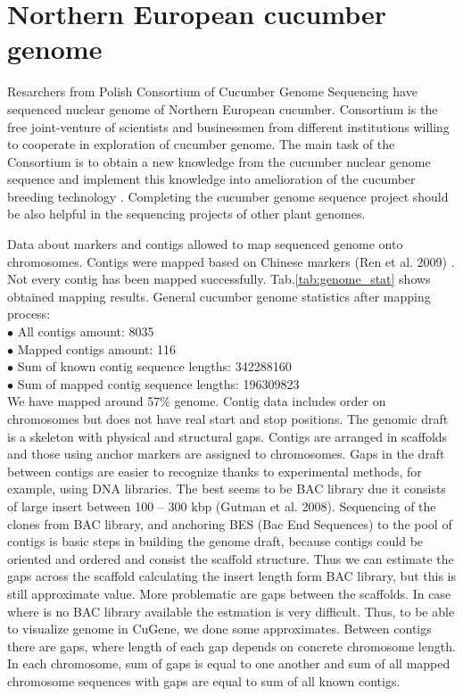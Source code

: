 \documentclass[a4paper]{spie}
\newcommand{\appName}{CuGene}
\begin{document}
\section{Northern European cucumber genome}
Resarchers from Polish Consortium of Cucumber Genome Sequencing have sequenced nuclear genome of Northern European cucumber.
Consortium is the free joint-venture of scientists and businessmen from different institutions willing to cooperate in exploration of cucumber genome. The main task of the Consortium is to obtain a new knowledge from the cucumber nuclear genome sequence and implement this knowledge into amelioration of the cucumber breeding technology \cite{pawelkowicz2016next, przybecki2003isolation, przybecki2004polymorphom}. Completing the cucumber genome sequence project should be also helpful in the sequencing projects of other plant genomes.

Data about markers and contigs allowed to map sequenced genome onto chromosomes. Contigs were mapped based on Chinese markers (Ren et al. 2009) . Not every contig has been mapped successfully. Tab.\ref{tab:genome_stat} shows obtained mapping results.
General cucumber genome statistics after mapping process:\\
$\bullet$ All contigs amount: 8035 \\
$\bullet$ Mapped contigs amount: 116 \\
$\bullet$ Sum of known contig sequence lengths: 342288160 \\
$\bullet$ Sum of mapped contig sequence lengths: 196309823 \\
We have mapped around 57\% genome. Contig data includes order on chromosomes but does not have real start and stop positions. The genomic draft is a skeleton with physical and structural gaps. Contigs  are arranged in scaffolds and those using anchor markers are assigned to chromosomes. Gaps in the draft between contigs are easier to recognize thanks to experimental methods, for example, using DNA libraries. The best seems to be BAC library due it consists of large insert  between 100 – 300 kbp (Gutman et al. 2008). Sequencing of the clones from BAC library, and anchoring BES (Bac End Sequences) to the pool of contigs is basic steps in building the genome draft, because contigs could be oriented and ordered and consist the scaffold structure. Thus we can estimate the gaps across the scaffold calculating the insert length form BAC library, but this is still approximate value. More problematic are gaps between the scaffolds. In case where is no BAC library available the estmation is very difficult. Thus, to be able to visualize genome in \appName{}, we done some approximates. Between contigs there are gaps, where length of each gap depends on concrete chromosome length. In each chromosome, sum of gaps is equal to one another and sum of all mapped chromosome sequences with gaps are equal to sum of all known contigs.
\end{document}
